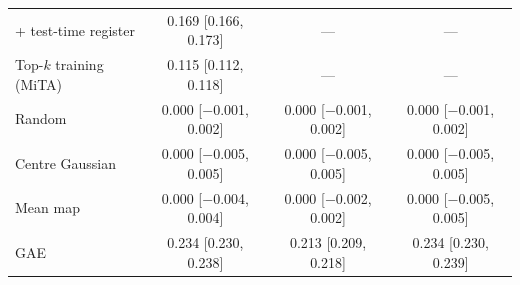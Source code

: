 \begin{tabular}{lccc}
+ test-time register & 0.169 {\scriptsize [0.166, 0.173]} & --- & --- \\
Top-$k$ training (MiTA) & 0.115 {\scriptsize [0.112, 0.118]} & --- & --- \\
\addlinespace[2pt]
Random & 0.000 {\scriptsize [$-$0.001, 0.002]} & 0.000 {\scriptsize [$-$0.001, 0.002]} & 0.000 {\scriptsize [$-$0.001, 0.002]} \\
Centre Gaussian & 0.000 {\scriptsize [$-$0.005, 0.005]} & 0.000 {\scriptsize [$-$0.005, 0.005]} & 0.000 {\scriptsize [$-$0.005, 0.005]} \\
Mean map & 0.000 {\scriptsize [$-$0.004, 0.004]} & 0.000 {\scriptsize [$-$0.002, 0.002]} & 0.000 {\scriptsize [$-$0.005, 0.005]} \\
GAE & 0.234 {\scriptsize [0.230, 0.238]} & 0.213 {\scriptsize [0.209, 0.218]} & 0.234 {\scriptsize [0.230, 0.239]} \\
\bottomrule
\end{tabular}
